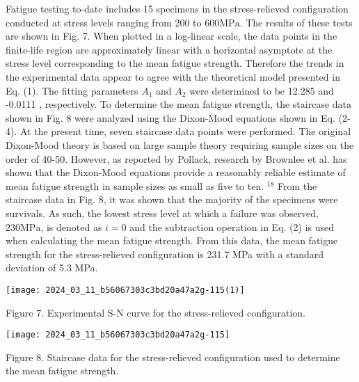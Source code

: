\documentclass[10pt]{article}
\begin{document}
Fatigue testing to-date includes 15 specimens in the stress-relieved configuration conducted at stress levels ranging from 200 to $600 \mathrm{MPa}$. The results of these tests are shown in Fig. 7. When plotted in a log-linear scale, the data points in the finite-life region are approximately linear with a horizontal asymptote at the stress level corresponding to the mean fatigue strength. Therefore the trends in the experimental data appear to agree with the theoretical model presented in Eq. (1). The fitting parameters $A_{1}$ and $A_{2}$ were determined to be 12.285 and -0.0111 , respectively. To determine the mean fatigue strength, the staircase data shown in Fig. 8 were analyzed using the Dixon-Mood equations shown in Eq. (2-4). At the present time, seven staircase data points were performed. The original Dixon-Mood theory is based on large sample theory requiring sample sizes on the order of 40-50. However, as reported by Pollack, research by Brownlee et al. has shown that the Dixon-Mood equations provide a reasonably reliable estimate of mean fatigue strength in sample sizes as small as five to ten. ${ }^{18}$ From the staircase data in Fig. 8, it was shown that the majority of the specimens were survivals. As such, the lowest stress level at which a failure was observed, $230 \mathrm{MPa}$, is denoted as $i=0$ and the subtraction operation in Eq. (2) is used when calculating the mean fatigue strength. From this data, the mean fatigue strength for the stress-relieved configuration is 231.7 MPa with a standard deviation of 5.3 MPa.

\begin{center}
\texttt{[image: 2024\_03\_11\_b56067303c3bd20a47a2g-115(1)]}
\end{center}

Figure 7. Experimental S-N curve for the stress-relieved configuration.

\begin{center}
\texttt{[image: 2024\_03\_11\_b56067303c3bd20a47a2g-115]}
\end{center}

Figure 8. Staircase data for the stress-relieved configuration used to determine the mean fatigue strength.
\end{document}
